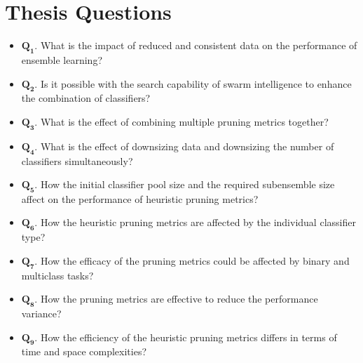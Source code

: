 \section{Thesis Questions}
\label{sec:1_introduction_questions}

\begin{itemize}[nosep]
    \setlength{\itemindent}{-.5in}
       \item $\pmb{Q_1}$. What is the impact of reduced and consistent data on the performance of ensemble learning?
        \item $\pmb{Q_2}$. Is it possible with the search capability of swarm intelligence to enhance the combination of classifiers? 
        \item $\pmb{Q_3}$. What is the effect of combining multiple pruning metrics together?
        \item $\pmb{Q_4}$. What is the effect of downsizing data and downsizing the number of classifiers simultaneously? 
        \item $\pmb{Q_5}$. How the initial classifier pool size and the required subensemble size affect on the performance of heuristic pruning metrics?
        \item $\pmb{Q_6}$. How the heuristic pruning metrics are affected by the individual classifier type?
        \item $\pmb{Q_7}$. How the efficacy of the pruning metrics could be affected by binary and multiclass tasks?
        \item $\pmb{Q_8}$. How the pruning metrics are effective to reduce the performance variance?
        \item $\pmb{Q_9}$. How the efficiency of the heuristic pruning metrics differs in terms of time and space complexities?
    \end{itemize}
    